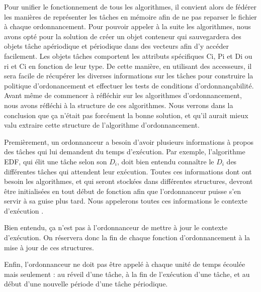 		Pour unifier le fonctionnement de tous les algorithmes, il convient alors de fédérer les manières de représenter les tâches en mémoire afin de ne pas reparser le fichier à chaque ordonnancement. Pour pouvoir appeler à la suite les algorithmes, nous avons opté pour la solution de créer un objet conteneur qui sauvegardera des objets tâche apériodique et périodique dans des vecteurs afin d'y accéder facilement.
		Les objets tâches comportent les attributs spécifiques Ci, Pi et Di ou ri et Ci en fonction de leur type. De cette manière, en utilisant des accesseurs, il sera facile de récupérer les diverses informations sur les tâches pour construire la politique d'ordonancement et effectuer les tests de conditions d'ordonnançabilité.\\

		Avant même de commencer à réfléchir sur les algorithmes d'ordonnancement, nous avons réfléchi à la structure de ces algorithmes. Nous verrons dans la conclusion que ça n'était pas forcément la bonne solution, et qu'il aurait mieux valu extraire cette structure de l'algorithme d'ordonnancement.
		
		Premièrement, un ordonnanceur a besoin d'avoir plusieurs informations à propos des tâches qui lui demandent du temps d'exécution. Par exemple, l'algorithme EDF, qui élit une tâche selon son $D_i$, doit bien entendu connaître le $D_i$ des différentes tâches qui attendent leur exécution. Toutes ces informations dont ont besoin les algorithmes, et qui seront stockées dans différentes structures, devront être initialisées en tout début de fonction afin que l'ordonnanceur puisse s'en servir à sa guise plus tard. Nous appelerons toutes ces informations le \og contexte d'exécution \fg.
		
		Bien entendu, ça n'est pas à l'ordonnanceur de mettre à jour le contexte d'exécution. On réservera donc la fin de chaque fonction d'ordonnancement à la mise à jour de ces structures.
		
		Enfin, l'ordonnanceur ne doit pas être appelé à chaque unité de temps écoulée mais seulement : au réveil d'une tâche, à la fin de l'exécution d'une tâche, et au début d'une nouvelle période d'une tâche périodique.\\
		
